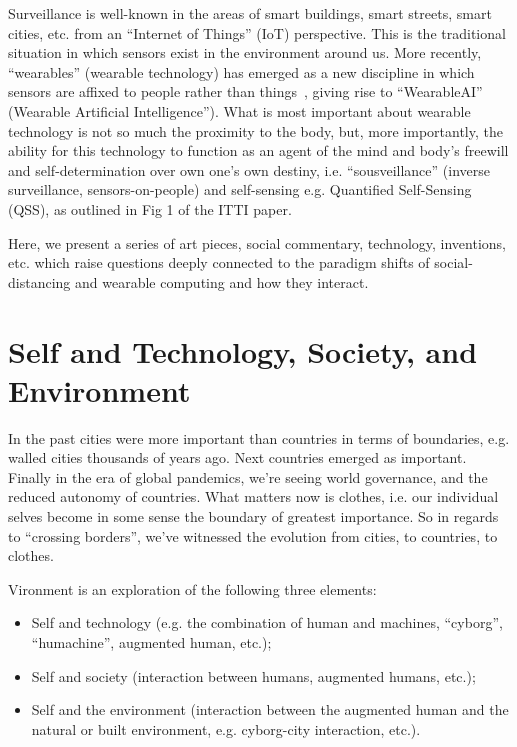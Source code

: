 \documentclass[journal]{journal}
\begin{document}
Surveillance is well-known in the areas of
smart buildings, smart streets, smart cities, etc. from an ``Internet of Things'' (IoT) perspective.  This is the traditional situation in which sensors
exist in the environment around us. More recently, ``wearables'' (wearable technology) has emerged as a new discipline in which sensors are affixed to people rather than things~\cite{barfieldbook2, starner97, mannieeecomputer}, giving rise to ``WearableAI\cite{wearableai}'' (Wearable Artificial Intelligence'').
What is most important about wearable technology is not so much the proximity to the body, but, more importantly, the ability for this technology to function as an agent of the mind and body's freewill and self-determination over own one's own destiny, i.e. 
``sousveillance''\cite{mann2002sousveillance, mann2003sousveillance, fletcher2011, measuringVeillanceVixels, michael2012sousveillance, bakir2010sousveillance, Bradshaw2013Police, Freshwater2013Revisiting} (inverse surveillance, sensors-on-people) and self-sensing e.g. Quantified Self-Sensing (QSS)\cite{intelligentimageprocessing, kelly2007quantified}, as outlined in Fig 1 of the ITTI paper\cite{itti}.

Here, we present a series of art pieces, social commentary, technology, inventions, etc. which raise questions deeply connected to the paradigm shifts of social-distancing and wearable computing and how they interact.

\section{Self and Technology, Society, and Environment}
In the past cities were more important than countries in terms of boundaries, e.g. walled cities thousands of years ago.  Next countries emerged as important.  Finally in the era of global pandemics, we're seeing world governance, and the reduced autonomy of countries.  What matters now is clothes, i.e. our individual selves become in some sense the boundary of greatest importance.  So in regards to ``crossing borders'', we've witnessed the evolution from cities, to countries, to clothes.

Vironment is an exploration of the following three elements:
\begin{itemize}
    \item Self and technology (e.g. the combination of human and machines, ``cyborg'', ``humachine'', augmented human, etc.);
    \item Self and society (interaction between humans, augmented humans, etc.);
    \item Self and the environment (interaction between the augmented human and the natural or built environment, e.g. cyborg-city interaction, etc.)\cite{mann2020sensing}.
\end{itemize}
\end{document}
